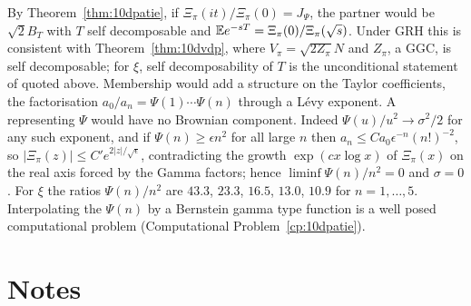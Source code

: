 By Theorem~\ref{thm:10dpatie}, if $\Xi_\pi(it)/\Xi_\pi(0) = J_\Psi$, the partner would be $\sqrt2B_T$ with $T$ self decomposable and $\mathbb{E} e^{-sT} = \Xi_\pi(0)/\Xi_\pi(\sqrt s)$. Under GRH this is consistent with Theorem~\ref{thm:10dvdp}, where $V_\pi = \sqrt{2Z_\pi}N$ and $Z_\pi$, a GGC, is self decomposable; for $\xi$, self decomposability of $T$ is the unconditional statement of \cite{polson2018vdp} quoted above. Membership would add a structure on the Taylor coefficients, the factorisation $a_0/a_n = \Psi(1)\cdots\Psi(n)$ through a L\'evy exponent. A representing $\Psi$ would have no Brownian component. Indeed $\Psi(u)/u^2\to\sigma^2/2$ for any such exponent, and if $\Psi(n)\ge\epsilon n^2$ for all large $n$ then $a_n\le Ca_0\epsilon^{-n}(n!)^{-2}$, so $|\Xi_\pi(z)|\le C'e^{2|z|/\sqrt\epsilon}$, contradicting the growth $\exp(cx\log x)$ of $\Xi_\pi(x)$ on the real axis forced by the Gamma factors; hence $\liminf\Psi(n)/n^2 = 0$ and $\sigma = 0$. For $\xi$ the ratios $\Psi(n)/n^2$ are $43.3$, $23.3$, $16.5$, $13.0$, $10.9$ for $n = 1,\dots,5$. Interpolating the $\Psi(n)$ by a Bernstein gamma type function is a well posed computational problem (Computational Problem~\ref{cp:10dpatie}).

\section{Notes}

